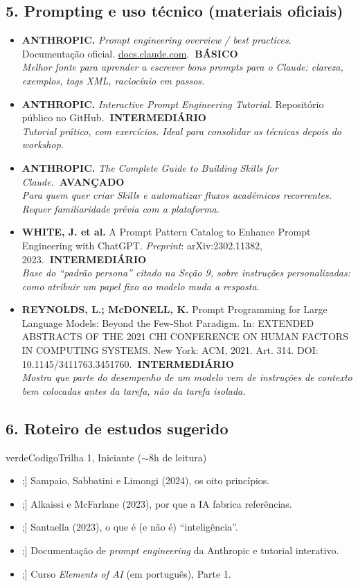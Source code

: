 \documentclass[11pt,a4paper]{article}
\newcommand{\checkboxicon}[1]{\tikz[baseline=-0.05cm]{\node[draw=#1,thick,rounded corners=1.2pt,minimum width=0.34cm,minimum height=0.34cm,inner sep=0pt]{};}}
\newcommand{\itemcheck}[2][azulUNI]{\item[\checkboxicon{#1}] #2}
\newcommand{\refc}[2]{\item #1\\{\footnotesize\color{cinzaescuro}\textit{#2}}}
\newcommand{\nivelbasico}{\hfill\colorbox{verdeCodigo}{\color{white}\scriptsize\poppinsmed\textbf{~BÁSICO~}}}
\newcommand{\nivelinterm}{\hfill\colorbox{amareloSol}{\color{black}\scriptsize\poppinsmed\textbf{~INTERMEDIÁRIO~}}}
\newcommand{\nivelavancado}{\hfill\colorbox{laranjaDestaque}{\color{white}\scriptsize\poppinsmed\textbf{~AVANÇADO~}}}
\begin{document}
\subsection*{5. Prompting e uso técnico (materiais oficiais)}
\begin{itemize}[leftmargin=1.4em,label={}]
\refc{\textbf{ANTHROPIC.} \textit{Prompt engineering overview / best practices}. Documentação oficial. \url{docs.claude.com}.\nivelbasico}{Melhor fonte para aprender a escrever bons prompts para o Claude: clareza, exemplos, tags XML, raciocínio em passos.}
\refc{\textbf{ANTHROPIC.} \textit{Interactive Prompt Engineering Tutorial}. Repositório público no GitHub.\nivelinterm}{Tutorial prático, com exercícios. Ideal para consolidar as técnicas depois do workshop.}
\refc{\textbf{ANTHROPIC.} \textit{The Complete Guide to Building Skills for Claude}.\nivelavancado}{Para quem quer criar \textit{Skills} e automatizar fluxos acadêmicos recorrentes. Requer familiaridade prévia com a plataforma.}
\refc{\textbf{WHITE, J. et al.} A Prompt Pattern Catalog to Enhance Prompt Engineering with ChatGPT. \textit{Preprint}: arXiv:2302.11382, 2023.\nivelinterm}{Base do ``padrão persona'' citado na Seção 9, sobre instruções personalizadas: como atribuir um papel fixo ao modelo muda a resposta.}
\refc{\textbf{REYNOLDS, L.; McDONELL, K.} Prompt Programming for Large Language Models: Beyond the Few-Shot Paradigm. In: EXTENDED ABSTRACTS OF THE 2021 CHI CONFERENCE ON HUMAN FACTORS IN COMPUTING SYSTEMS. New York: ACM, 2021. Art. 314. DOI: 10.1145/3411763.3451760.\nivelinterm}{Mostra que parte do desempenho de um modelo vem de instruções de contexto bem colocadas antes da tarefa, não da tarefa isolada.}
\end{itemize}

\clearpage
\subsection*{6. Roteiro de estudos sugerido}
\begin{checklist}{verdeCodigo}{Trilha 1, Iniciante ($\sim$8h de leitura)}
\begin{itemize}[leftmargin=1.6em, itemsep=4pt]
  \itemcheck[verdeCodigo]{Sampaio, Sabbatini e Limongi (2024), os oito princípios.}
  \itemcheck[verdeCodigo]{Alkaissi e McFarlane (2023), por que a IA fabrica referências.}
  \itemcheck[verdeCodigo]{Santaella (2023), o que é (e não é) ``inteligência''.}
  \itemcheck[verdeCodigo]{Documentação de \textit{prompt engineering} da Anthropic e tutorial interativo.}
  \itemcheck[verdeCodigo]{Curso \textit{Elements of AI} (em português), Parte 1.}
\end{itemize}
\end{checklist}
\end{document}
